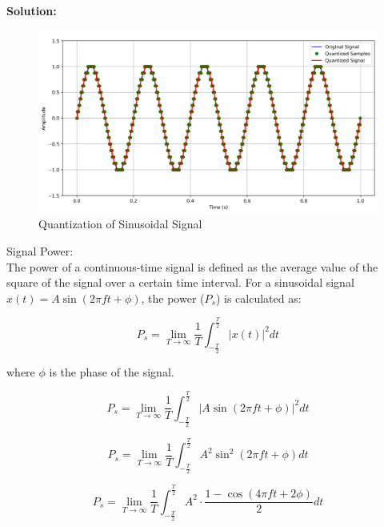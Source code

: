 \documentclass[journal,12pt,onecolumn]{IEEEtran}
\begin{document}
\textbf{Solution:}
\begin{table}[H]

\label{table:Gate.31.2023.0}
\end{table}
\begin{figure}[H]
  \centering
  \includegraphics[width=1\textwidth]{Graph/a.png}
  \caption{Quantization of Sinusoidal Signal}
  \label{fig:Gate.31.2023.1}
\end{figure}
\enumerate
\item Signal Power: \\
The power of a continuous-time signal is defined as the average value of the square of the signal over a certain time interval. For a sinusoidal signal \(x(t) = A \sin(2\pi f t + \phi)\), the power (\(P_s\)) is calculated as:

\begin{equation}
P_s = \lim_{{T \to \infty}} \frac{1}{T} \int_{{-\frac{T}{2}}}^{{\frac{T}{2}}} |x(t)|^2 dt
\end{equation}

where \(\phi\) is the phase of the signal.

\begin{equation}
P_s = \lim_{{T \to \infty}} \frac{1}{T} \int_{{-\frac{T}{2}}}^{{\frac{T}{2}}} |A \sin(2\pi f t + \phi)|^2 dt
\end{equation}

\begin{equation}
P_s = \lim_{{T \to \infty}} \frac{1}{T} \int_{{-\frac{T}{2}}}^{{\frac{T}{2}}} A^2 \sin^2(2\pi f t + \phi) dt
\end{equation}

\begin{equation}
P_s = \lim_{{T \to \infty}} \frac{1}{T} \int_{{-\frac{T}{2}}}^{{\frac{T}{2}}} A^2 \cdot \frac{1 - \cos(4\pi f t + 2\phi)}{2} dt
\end{equation}
\end{document}
